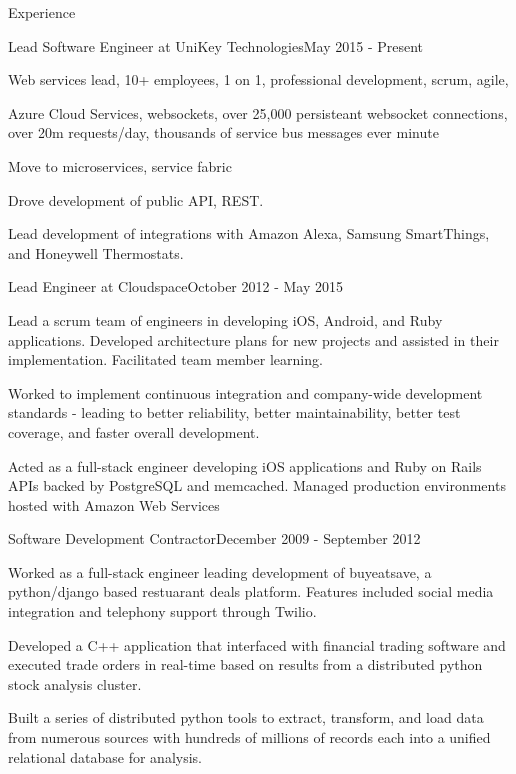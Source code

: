 \documentclass{resume} %
\begin{document}
\begin{rSection}{Experience}


\begin{rSubsection}{Lead Software Engineer at UniKey Technologies}{May 2015 - Present}{}{}

\item Web services lead, 10+ employees, 1 on 1, professional development, scrum, agile, 
\item Azure Cloud Services, websockets, over 25,000 persisteant websocket connections, over 20m requests/day, thousands of service bus messages ever minute
\item Move to microservices, service fabric
\item Drove development of public API, REST.  
\item Lead development of integrations with Amazon Alexa, Samsung SmartThings, and Honeywell Thermostats.

\end{rSubsection}



\begin{rSubsection}{Lead Engineer at Cloudspace}{October 2012 - May 2015}{}{}

\item Lead a scrum team of engineers in developing iOS, Android, and Ruby applications.  Developed architecture plans for new projects and assisted in their implementation. Facilitated team member learning.
\item Worked to implement continuous integration and company-wide development standards - leading to better reliability, better maintainability, better test coverage, and faster overall development.
\item Acted as a full-stack engineer developing iOS applications and Ruby on Rails APIs backed by PostgreSQL and memcached. Managed production environments hosted with Amazon Web Services

\end{rSubsection}


\begin{rSubsection}{Software Development Contractor}{December 2009 - September 2012}{}{}

\item Worked as a full-stack engineer leading development of buyeatsave, a python/django based restuarant deals platform.  Features included social media integration and telephony support through Twilio.
\item Developed a C++ application that interfaced with financial trading software and executed trade orders in real-time based on results from a distributed python stock analysis cluster.
\item Built a series of distributed python tools to extract, transform, and load data from numerous sources with hundreds of millions of records each into a unified relational database for analysis.



\end{rSubsection}
\end{rSection}
\end{document}
